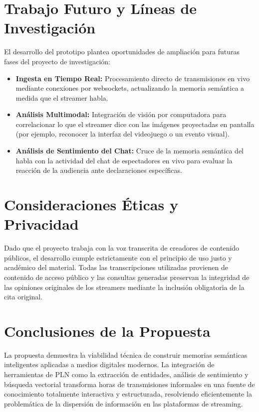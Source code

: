 \documentclass[12pt,a4paper]{article}
\begin{document}
\section{Trabajo Futuro y Líneas de Investigación}
El desarrollo del prototipo plantea oportunidades de ampliación para futuras fases del proyecto de investigación:
\begin{itemize}
  \item \textbf{Ingesta en Tiempo Real:} Procesamiento directo de transmisiones en vivo mediante conexiones por websockets, actualizando la memoria semántica a medida que el streamer habla.
  \item \textbf{Análisis Multimodal:} Integración de visión por computadora para correlacionar lo que el streamer dice con las imágenes proyectadas en pantalla (por ejemplo, reconocer la interfaz del videojuego o un evento visual).
  \item \textbf{Análisis de Sentimiento del Chat:} Cruce de la memoria semántica del habla con la actividad del chat de espectadores en vivo para evaluar la reacción de la audiencia ante declaraciones específicas.
\end{itemize}

\section{Consideraciones Éticas y Privacidad}
Dado que el proyecto trabaja con la voz transcrita de creadores de contenido públicos, el desarrollo cumple estrictamente con el principio de uso justo y académico del material. Todas las transcripciones utilizadas provienen de contenido de acceso público y las consultas generadas preservan la integridad de las opiniones originales de los streamers mediante la inclusión obligatoria de la cita original.

\section{Conclusiones de la Propuesta}
La propuesta demuestra la viabilidad técnica de construir memorias semánticas inteligentes aplicadas a medios digitales modernos. La integración de herramientas de PLN como la extracción de entidades, análisis de sentimiento y búsqueda vectorial transforma horas de transmisiones informales en una fuente de conocimiento totalmente interactiva y estructurada, resolviendo eficientemente la problemática de la dispersión de información en las plataformas de streaming.
\end{document}
